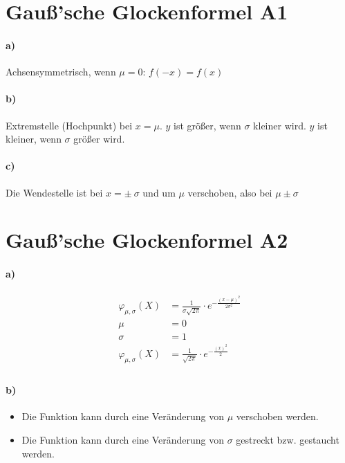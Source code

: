\documentclass[12pt,a4paper]{report}
\begin{document}
	\section{Gauß'sche Glockenformel A1}
	\paragraph{a)}
	Achsensymmetrisch, wenn $\mu=0$: $f(-x) = f(x)$
	\paragraph{b)}
	Extremstelle (Hochpunkt) bei $x=\mu$. $y$ ist größer, wenn $\sigma$ kleiner wird. $y$ ist kleiner, wenn $\sigma$ größer wird.
	\paragraph{c)}	
	Die Wendestelle ist bei $x = \pm\ \sigma$ und um $\mu$ verschoben, also bei $\mu \pm \sigma$
	\section{Gauß'sche Glockenformel A2}
	\paragraph{a)}
	\begin{align*}
		\varphi_{\mu,\sigma} (X) &= \frac{1}{\sigma\sqrt{2\pi}} \cdot e^{-\frac{(x-\mu)^2}{2\sigma^2}} \\
		\mu &= 0 \\
		\sigma &= 1 \\
		\varphi_{\mu,\sigma} (X) &= \frac{1}{\sqrt{2\pi}} \cdot e^{-\frac{(x)^2}{2}} \\
	\end{align*}
	\paragraph{b)}
	\begin{itemize}
		\item Die Funktion kann durch eine Veränderung von $\mu$ verschoben werden.
		\item Die Funktion kann durch eine Veränderung von $\sigma$ gestreckt bzw. gestaucht werden.
	\end{itemize}
\end{document}
